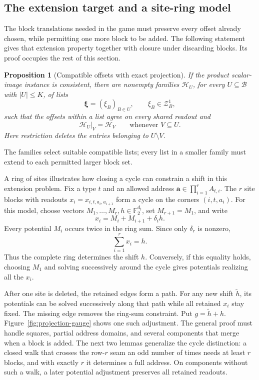 \documentclass[11pt]{article}
\newtheorem{proposition}[theorem]{Proposition}
\theoremstyle{definition}
\begin{document}
\subsection{The extension target and a site-ring model}

The block translations needed in the game must preserve every offset
already chosen, while permitting one more block to be added. The following
statement gives that extension property together with closure under
discarding blocks. Its proof occupies the rest of this section.

\begin{proposition}[Compatible offsets with exact projection]
\label{prop:exact-projection}
If the product scalar-image instance is consistent, there are nonempty
families \(\mathcal H_U\), for every \(U\subseteq\mathcal B\) with \(\left\lvert{U}\right\rvert\le K\),
of lists
\[
  \boldsymbol\xi=(\xi_B)_{B\in U},\qquad \xi_B\in\mathcal Z_B^1,
\]
such that the offsets within a list agree on every shared readout and
\begin{equation}
       \mathcal H_U|_V=\mathcal H_V
       \qquad\text{whenever }V\subseteq U.
       \label{eq:exact-projection}
\end{equation}
Here restriction deletes the entries belonging to \(U\setminus V\).
\end{proposition}

The families select suitable compatible lists; every list in a smaller
family must extend to each permitted larger block set.

A ring of sites illustrates how closing a cycle can constrain a shift
in this extension problem. Fix a type \(t\) and an allowed address
\(\mathbf a\in\prod_{i=1}^r A_{t,i}\). The \(r\) site blocks with
readouts \(x_i=x_{i,t,a_i,a_{i+1}}\) form a cycle on the corners
\((i,t,a_i)\). For this model, choose vectors
\(M_1,\ldots,M_r,h\in\mathbb F_2^{d_t}\), set \(M_{r+1}=M_1\), and write
\[
             x_i=M_i+M_{i+1}+\delta_i h.
\]
Every potential \(M_i\) occurs twice in the ring sum. Since only
\(\delta_r\) is nonzero,
\[
                         \sum_{i=1}^r x_i=h.
\]
Thus the complete ring determines the shift \(h\). Conversely, if
this equality holds, choosing \(M_1\) and solving successively around
the cycle gives potentials realizing all the \(x_i\).

After one site is deleted, the retained edges form a path. For any
new shift \(\widetilde h\), its potentials can be solved successively
along that path while all retained \(x_i\) stay fixed. The missing
edge removes the ring-sum constraint. Put \(g=\widetilde h+h\).
Figure~\ref{fig:projection-gauge} shows one such adjustment.
The general proof must handle squares,
partial address domains, and several components that merge when a
block is added. The next two lemmas generalize the cycle distinction:
a closed walk that crosses the row-\(r\) seam an odd number of times
needs at least \(r\) blocks, and with exactly \(r\) it determines a
full address. On components without such a walk, a later potential
adjustment preserves all retained readouts.
\end{document}
